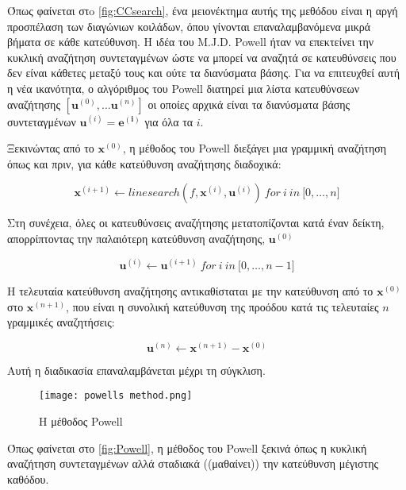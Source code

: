 Όπως φαίνεται στo \autoref{fig:CCsearch}, ένα μειονέκτημα αυτής της μεθόδου είναι η αργή
προσπέλαση των διαγώνιων κοιλάδων, όπου γίνονται επαναλαμβανόμενα μικρά βήματα σε
κάθε κατεύθυνση. Η ιδέα του \textlatin{M.J.D. Powell} ήταν να επεκτείνει την κυκλική
αναζήτηση συντεταγμένων ώστε να μπορεί να αναζητά σε κατευθύνσεις που
δεν είναι κάθετες μεταξύ τους και ούτε τα διανύσματα βάσης. Για να
επιτευχθεί αυτή η νέα ικανότητα, ο αλγόριθμος του \textlatin{Powell} διατηρεί μια λίστα
κατευθύνσεων αναζήτησης
$\left\lbrack \mathbf{u}^{(0)},\ldots\mathbf{u}^{(n)} \right\rbrack$
οι οποίες αρχικά είναι τα διανύσματα βάσης συντεταγμένων
$\mathbf{u}^{(i)}=\mathbf{e}^{\left( \mathbf{i} \right)}$ για
όλα τα $i$.

Ξεκινώντας από το $\mathbf{x}^{(0)}$, η μέθοδος του \textlatin{Powell} διεξάγει μια γραμμική αναζήτηση όπως και πριν, για κάθε κατεύθυνση αναζήτησης διαδοχικά:


\begin{equation}
\mathbf{x}^{(i + 1)} \leftarrow linesearch\left( f,\mathbf{x}^{(i)}\mathbf{,}\mathbf{u}^{(i)} \right)\mathbf{\ }for\ i\ in\ \lbrack 0,\ldots,n\rbrack
\end{equation}

Στη συνέχεια, όλες οι κατευθύνσεις αναζήτησης μετατοπίζονται κατά έναν δείκτη,
απορρίπτοντας την παλαιότερη κατεύθυνση αναζήτησης, $\mathbf{u}^{(0)}\ $

\begin{equation}
\mathbf{u}^{(i)} \leftarrow \mathbf{u}^{(i + 1)}\ for\ i\ in\ \lbrack 0,\ldots,n - 1\rbrack
\end{equation}

Η τελευταία κατεύθυνση αναζήτησης αντικαθίσταται με την κατεύθυνση από
το $\mathbf{x}^{(0)}$ στο $\mathbf{x}^{(n + 1)}$, που είναι η συνολική
κατεύθυνση της προόδου κατά τις τελευταίες $n$ γραμμικές αναζητήσεις:

\begin{equation}
\mathbf{u}^{(n)} \leftarrow \mathbf{x}^{(n + 1)} - \mathbf{x}^{(0)}
\end{equation}

Αυτή η διαδικασία επαναλαμβάνεται μέχρι τη σύγκλιση.
\begin{figure}[H]
    \centering
    \texttt{[image: powells method.png]}
    \caption{Η μέθοδος \textlatin{Powell} \cite{kochenderfer2019}}
    \label{fig:Powell}

\end{figure}

Όπως φαίνεται στο \autoref{fig:Powell}, η μέθοδος του Powell ξεκινά όπως η κυκλική
αναζήτηση συντεταγμένων αλλά σταδιακά ((μαθαίνει)) την κατεύθυνση μέγιστης καθόδου.


